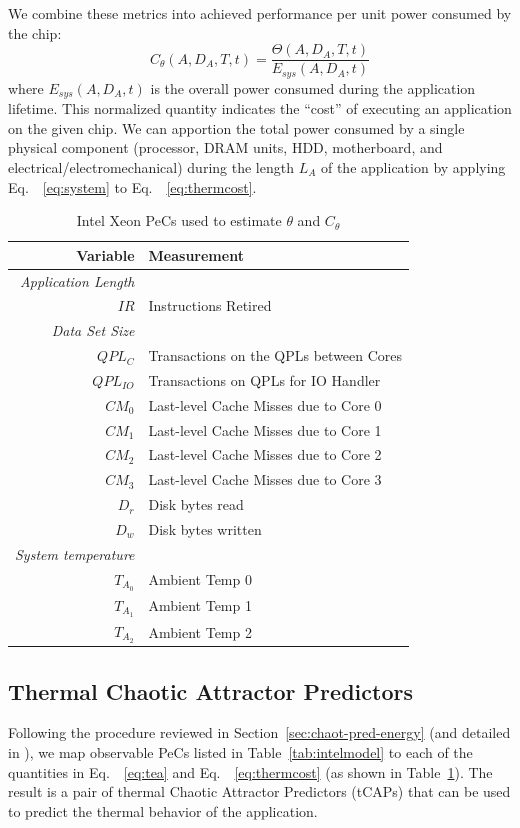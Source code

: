 \documentclass[times, 10pt,twocolumn]{IEEEtran}
\newcommand{\equationname}{Eq.\ }
\begin{document}
We combine these metrics into achieved performance per unit power
consumed by the chip:
\begin{equation}
\label{eq:thermcost} C_{\theta}(A, D_{A}, T,t)=\frac{\Theta(A,D_{A}, T,
t)}{E_{sys}(A,D_{A},t)}
\end{equation} where $E_{sys}(A,D_{A},t)$ is the overall power consumed
during the application lifetime. This normalized quantity indicates the
``cost'' of executing an application on the given chip.  We can
apportion the total power consumed by a single physical component
(processor, DRAM units, HDD, motherboard, and
electrical/electromechanical) during the length $L_{A}$ of the
application by applying \equationname~\eqref{eq:system} to
\equationname~\eqref{eq:thermcost}.
\begin{table}[tbhp] \centering
  \caption{Intel Xeon PeCs used to estimate $\theta$ and $C_{\theta}$}
  \label{tab:tcappecs}
  \begin{tabular}{r l} \hline \textbf{Variable}&\textbf{Measurement}\\
\hline \textit{Application Length}&\\ $IR$&Instructions Retired \\
\textit{Data Set Size}&\\ $QPL_{C}$&Transactions on the QPLs between
Cores\\ $QPL_{IO}$&Transactions on QPLs for IO Handler\\
$CM_{0}$&Last-level Cache Misses due to Core 0\\ $CM_{1}$&Last-level
Cache Misses due to Core 1\\ $CM_{2}$&Last-level Cache Misses due to
Core 2\\ $CM_{3}$&Last-level Cache Misses due to Core 3\\ $D_{r}$&Disk
bytes read\\ $D_{w}$&Disk bytes written\\ \textit{System temperature}&\\
$T_{A_{0}}$&Ambient Temp 0\\ $T_{A_{1}}$&Ambient Temp 1\\
$T_{A_{2}}$&Ambient Temp 2\\ \hline
  \end{tabular}
\end{table}
\subsection{Thermal Chaotic Attractor Predictors}
\label{sec:therm-chaot-attr} Following the procedure reviewed in
Section~\ref{sec:chaot-pred-energy} (and detailed in \cite{Lewis2010}),
we map observable PeCs listed in Table~\ref{tab:intelmodel} to each of
the quantities in \equationname~\eqref{eq:tea} and
\equationname~\eqref{eq:thermcost} (as shown in
Table~\ref{tab:tcappecs}). The result is a pair of thermal Chaotic
Attractor Predictors (tCAPs) that can be used to predict the thermal
behavior of the application.
\end{document}
